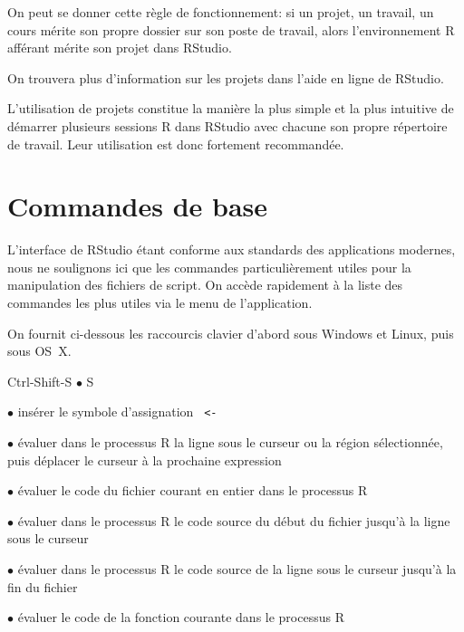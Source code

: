 On peut se donner cette règle de fonctionnement: si un projet, un
travail, un cours mérite son propre dossier sur son poste de travail,
alors l'environnement R afférant mérite son projet dans RStudio.

On trouvera plus d'information sur les projets dans l'aide en ligne
de RStudio.

\begin{important}
  L'utilisation de projets constitue la manière la plus simple et la
  plus intuitive de démarrer plusieurs sessions R dans RStudio avec
  chacune son propre répertoire de travail. Leur utilisation est donc
  fortement recommandée.
\end{important}


\section{Commandes de base}
\label{rstudio:commandes}

L'interface de RStudio étant conforme aux standards des applications
modernes, nous ne soulignons ici que les commandes particulièrement
utiles pour la manipulation des fichiers de script. On accède
rapidement à la liste des commandes les plus utiles via le menu
 de l'application.

On fournit ci-dessous les raccourcis clavier d'abord sous Windows et
Linux, puis sous OS~X.

\begin{ttscript}{Ctrl-Shift-S $\bullet$ \cmdkey\shiftkey S}
  \raggedright
\item[\rstudio{Alt+-} $\bullet$ \rstudio{\optkey\,-}] insérer le
  symbole d'assignation \verb*| <- |
\item[\rstudio{Ctrl+Retour} $\bullet$ \rstudio{\cmdkey\,\returnkey}]
  évaluer dans le processus R la ligne sous le curseur ou la région
  sélectionnée, puis déplacer le curseur à la prochaine expression
\item[\rstudio{Ctrl+Shift+S} $\bullet$ \rstudio{\shiftkey\,\cmdkey\,S}]
  évaluer le code du fichier courant en entier dans le processus R
\item[\rstudio{Ctrl+Alt+B} $\bullet$ \rstudio{\optkey\,\cmdkey\,B}]
  évaluer dans le processus R le code source du début du fichier
  jusqu'à la ligne sous le curseur
\item[\rstudio{Ctrl+Alt+E} $\bullet$ \rstudio{\optkey\,\cmdkey\,E}]
  évaluer dans le processus R le code source de la ligne sous le curseur
  jusqu'à la fin du fichier
\item[\rstudio{Ctrl+Alt+F} $\bullet$ \rstudio{\optkey\,\cmdkey\,F}]
  évaluer le code de la fonction courante dans le processus R
\end{ttscript}

